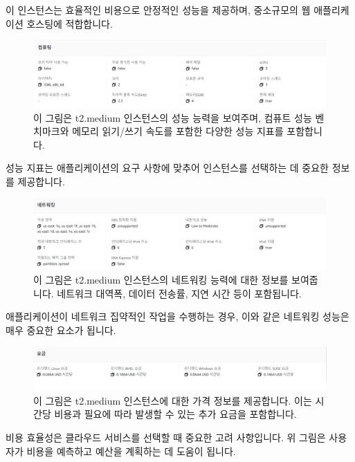 \documentclass[a4paper, 12pt]{article}
\begin{document}
이 인스턴스는 효율적인 비용으로 안정적인 성능을 제공하며, 중소규모의 웹 애플리케이션 호스팅에 적합합니다.

\begin{figure}[H]
\centering
\includegraphics[width=1\textwidth]{img/t2_medium_performance.png}
\caption{이 그림은 t2.medium 인스턴스의 성능 능력을 보여주며, 컴퓨트 성능 벤치마크와 메모리 읽기/쓰기 속도를 포함한 다양한 성능 지표를 포함합니다.}
\label{fig:t2_medium_performance}
\end{figure}

성능 지표는 애플리케이션의 요구 사항에 맞추어 인스턴스를 선택하는 데 중요한 정보를 제공합니다.

\begin{figure}[H]
\centering
\includegraphics[width=1\textwidth]{img/t2_medium_networking.png}
\caption{이 그림은 t2.medium 인스턴스의 네트워킹 능력에 대한 정보를 보여줍니다. 네트워크 대역폭, 데이터 전송률, 지연 시간 등이 포함됩니다.}
\label{fig:t2_medium_networking}
\end{figure}

애플리케이션이 네트워크 집약적인 작업을 수행하는 경우, 이와 같은 네트워킹 성능은 매우 중요한 요소가 됩니다.

\begin{figure}[H]
\centering
\includegraphics[width=1\textwidth]{img/t2_medium_pricing.png}
\caption{이 그림은 t2.medium 인스턴스에 대한 가격 정보를 제공합니다. 이는 시간당 비용과 필요에 따라 발생할 수 있는 추가 요금을 포함합니다.}
\label{fig:t2_medium_pricing}
\end{figure}

비용 효율성은 클라우드 서비스를 선택할 때 중요한 고려 사항입니다. 위 그림은 사용자가 비용을 예측하고 예산을 계획하는 데 도움이 됩니다.
\end{document}
